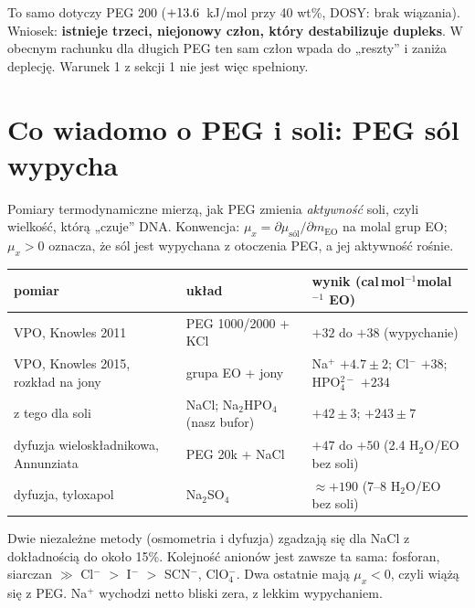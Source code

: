 \documentclass[11pt,a4paper]{article}
\begin{document}
To samo dotyczy PEG 200 ($+13.6$~kJ/mol przy 40 wt\%, DOSY: brak wiązania). Wniosek: \textbf{istnieje trzeci, niejonowy człon, który destabilizuje dupleks}. W obecnym rachunku dla długich PEG ten sam człon wpada do „reszty” i zaniża deplecję. Warunek 1 z sekcji 1 nie jest więc spełniony.

\section{Co wiadomo o PEG i soli: PEG sól wypycha}

Pomiary termodynamiczne mierzą, jak PEG zmienia \emph{aktywność} soli, czyli wielkość, którą „czuje” DNA. Konwencja: $\mu_x=\partial\mu_\text{sól}/\partial m_\text{EO}$ na molal grup EO; $\mu_x>0$ oznacza, że sól jest wypychana z otoczenia PEG, a jej aktywność rośnie.

\begin{center}\small
\begin{tabular}{>{\raggedright\arraybackslash}p{5.2cm}>{\raggedright\arraybackslash}p{3.6cm}>{\raggedright\arraybackslash}p{6.2cm}}
\toprule
pomiar & układ & wynik (cal\,mol$^{-1}$molal$^{-1}$ EO)\\
\midrule
VPO, Knowles 2011 & PEG 1000/2000 + KCl & $+32$ do $+38$ (wypychanie)\\
VPO, Knowles 2015, rozkład na jony & grupa EO + jony & Na$^+$ $+4.7\pm2$; Cl$^-$ $+38$; HPO$_4^{2-}$ $+234$\\
\quad z tego dla soli & NaCl; Na$_2$HPO$_4$ (nasz bufor) & $+42\pm3$; $+243\pm7$\\
dyfuzja wieloskładnikowa, Annunziata & PEG 20k + NaCl & $+47$ do $+50$ (2.4 H$_2$O/EO bez soli)\\
dyfuzja, tyloxapol & Na$_2$SO$_4$ & $\approx+190$ (7--8 H$_2$O/EO bez soli)\\
\bottomrule
\end{tabular}
\end{center}

Dwie niezależne metody (osmometria i dyfuzja) zgadzają się dla NaCl z dokładnością do około 15\%. Kolejność anionów jest zawsze ta sama: fosforan, siarczan $\gg$ Cl$^-$ $>$ I$^-$ $>$ SCN$^-$, ClO$_4^-$. Dwa ostatnie mają $\mu_x<0$, czyli wiążą się z PEG. Na$^+$ wychodzi netto bliski zera, z lekkim wypychaniem.
\end{document}
